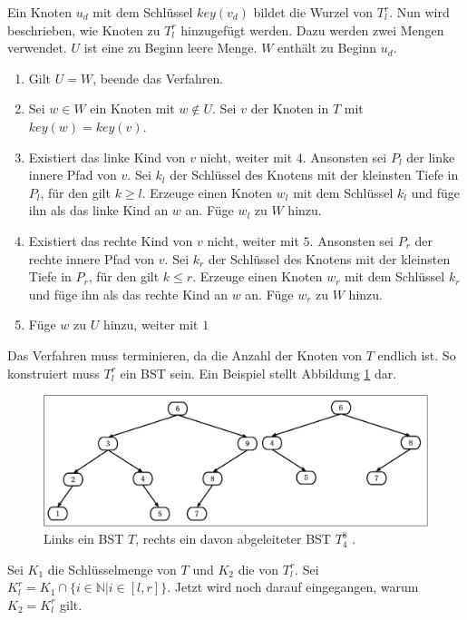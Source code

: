 \documentclass[a4paper,12pt]{article}
\begin{document}
\noindent Ein Knoten $u_d$ mit dem Schlüssel $\mathit{key}(v_d)$ bildet die Wurzel von $T^r_l$. Nun wird beschrieben, wie Knoten zu $T^r_l$ hinzugefügt werden.
Dazu werden zwei Mengen verwendet. $U$ ist eine zu Beginn leere Menge. $W$ enthält zu Beginn $u_d$.
\begin{enumerate}
	\item Gilt $U = W$, beende das Verfahren.
	\item Sei $w \in W$ ein Knoten mit $w \notin U$.  Sei $v$ der Knoten in $T$ mit \mbox{$\mathit{key}(w ) = \mathit{key}(v)$}.  
	\item Existiert das linke Kind von $v$ nicht, weiter mit $4$. Ansonsten sei  $P_l$ der linke innere Pfad von $v$. Sei $k_l$ der Schlüssel des Knotens mit der kleinsten Tiefe in $P_l$, für den gilt $k \geq l$. Erzeuge einen Knoten $w_l$ mit dem Schlüssel $k_l$ und füge ihn als das linke Kind an $w$ an. Füge $w_l$ zu $W$ hinzu.
	\item Existiert das rechte Kind von $v$ nicht, weiter mit $5$. Ansonsten sei $P_r$ der rechte innere Pfad von $v$. Sei $k_r$ der Schlüssel des Knotens mit der kleinsten Tiefe in $P_r$, für den gilt  $k \leq r$. Erzeuge einen Knoten $w_r$ mit dem Schlüssel $k_r$ und füge ihn als das rechte Kind an $w$ an. Füge $w_r$ zu $W$ hinzu.	
	\item Füge $w$ zu $U$ hinzu, weiter mit $1$
\end{enumerate}
Das Verfahren muss terminieren, da die Anzahl der Knoten von $T$ endlich ist. So konstruiert muss $T^r_l$ ein BST sein. Ein Beispiel stellt Abbildung \ref{fig:T_r_l} dar. 
\begin{figure}[H]
	\centering
	\includegraphics[width= 1\textwidth]{Medien/DynOpt/T_r_l}
	\caption{Links ein BST $T$, rechts ein davon abgeleiteter BST $T^8_4$ .  }
	\label{fig:T_r_l}
\end{figure}

\noindent Sei $K_1$ die Schlüsselmenge von $T$ und $K_2$ die von $T^r_l$. Sei ${K^r_l = K_1 \cap \{i \in \mathbb{N}\vert i \in \left[l,r\right] \}}$. Jetzt wird noch darauf eingegangen, warum $K_2 = K^r_l$ gilt. \\
\end{document}
